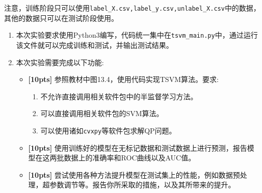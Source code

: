 \documentclass[a4paper,UTF8]{article}
\numberwithin{equation}{section}
\begin{document}
注意，训练阶段只可以使用\texttt{label\_X.csv,label\_y.csv,unlabel\_X.csv}中的数据，其他的数据只可以在测试阶段使用。
\begin{enumerate}[(1)]
    \item  本次实验要求使用Python3编写，代码统一集中在\texttt{tsvm\_main.py}中，通过运行该文件就可以完成训练和测试，并输出测试结果。
    \item 本次实验需要完成以下功能:
    \begin{itemize}
        \item \textbf{[10pts]} 参照教材中图13.4，使用代码实现TSVM算法。要求:
        \begin{enumerate}[1.]
            \item 不允许直接调用相关软件包中的半监督学习方法。
            \item 可以直接调用相关软件包的SVM算法。
            \item 可以使用诸如\texttt{cvxpy}等软件包求解QP问题。
        \end{enumerate}
        \item \textbf{[10pts]} 使用训练好的模型在无标记数据和测试数据上进行预测，报告模型在这两批数据上的准确率和ROC曲线以及AUC值。
        \item \textbf{[10pts]} 尝试使用各种方法提升模型在测试集上的性能，例如数据预处理，超参数调节等。报告你所采取的措施，以及其所带来的提升。
    \end{itemize}
\end{enumerate}
\end{document}
